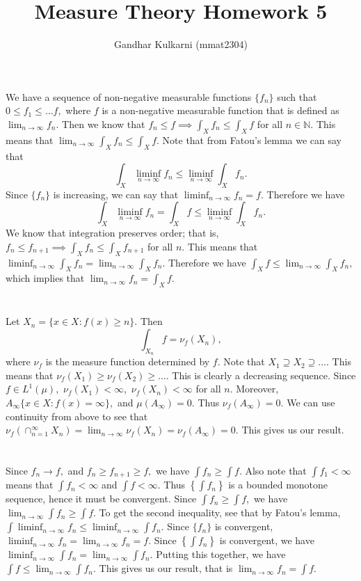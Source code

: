 \documentclass[]{article}
\title{Measure Theory Homework 5}
\author{Gandhar Kulkarni (mmat2304)}
\begin{document}
	
	\maketitle
	
	
	\section{} %
	We have a sequence of non-negative measurable functions $\{f_n\}$ such that $0 \leq f_1 \leq \dots f,$ where $f$ is a non-negative measurable function that is defined as $\lim_{n\to \infty}f_n.$ Then we know that $f_n \leq f \implies \int_{X}f_n \leq \int_{X}f$ for all $n \in \mathbb{N}.$ This means that $\lim_{n \to \infty}\int_{X}f_n \leq \int_{X}f.$ Note that from Fatou's lemma we can say that $$\int_{X}\liminf_{n \to \infty}f_n \leq \liminf_{n \to \infty} \int_{X}f_n.$$ Since $\{f_n\}$ is increasing, we can say that $\liminf_{n \to \infty} f_n=f.$ Therefore we have $$ \int_{X}\liminf_{n \to \infty}f_n = \int_{X}f \leq \liminf_{n \to \infty} \int_{X}f_n.$$ We know that integration preserves order; that is, $f_{n} \leq f_{n+1} \implies \int_{X}f_n \leq \int_{X}f_{n+1}$ for all $n$. This means that $\liminf_{n \to \infty} \int_{X}f_n=\lim_{n\to \infty} \int_{X} f_n.$ Therefore we have $ \int_{X}f \leq \lim_{n \to \infty}\int_{X}f_n,$ which implies that $\lim_{n \to \infty}f_n = \int_{X}f.$ 
	\section{} %
	Let $X_n=\{x \in X: f(x)\geq n\}.$ Then $$\int_{X_n}f=\nu_{f}(X_n),$$ where $\nu_f$ is the measure function determined by $f.$ Note that $ X_1 \supseteq X_2 \supseteq \dots.$ This means that $\nu_f(X_1) \geq \nu_{f}(X_2) \geq \dots .$ This is clearly a decreasing sequence. Since $f \in L^1(\mu),$ $\nu_f(X_1) < \infty,$ $\nu_f(X_n)<\infty$ for all $n.$ Moreover, $A_{\infty}\{x \in X: f(x)=\infty\},$ and $\mu(A_{\infty})=0.$ Thus $\nu_f(A_{\infty})=0.$ We can use continuity from above to see that $\nu_f(\cap_{n=1}^{\infty}X_n)=\lim_{n \to \infty} \nu_f(X_n)=\nu_{f}(A_{\infty})=0.$ This gives us our result. 
	\section{} %
	Since $f_n \to f,$ and $ f_n \geq f_{n+1} \geq f,$ we have $\int f_n \geq \int f.$ Also note that $\int f_1 < \infty$ means that $\int f_n < \infty$ and $\int f < \infty.$ Thus $\left\{ \int f_n\right\} $ is a bounded monotone sequence, hence it must be convergent. Since $\int f_n \geq \int f,$ we have $\lim_{n \to \infty} \int f_n \geq \int f.$ To get the second inequality, see that by Fatou's lemma, $\int \liminf_{n \to \infty} f_n \leq \liminf_{n \to \infty} \int f_n.$ Since $\{f_n\}$ is convergent, $\liminf_{n \to \infty} f_n=\lim_{n \to \infty} f_n=f.$ Since $\left\{\int f_n\right\}$ is convergent, we have $\liminf_{n \to \infty} \int f_n=\lim_{n \to \infty} \int f_n.$ Putting this together, we have $ \int f \leq \lim_{n \to \infty} \int f_n.$ This gives us our result, that is $\lim_{n \to \infty} f_n=\int f.$
\end{document}
